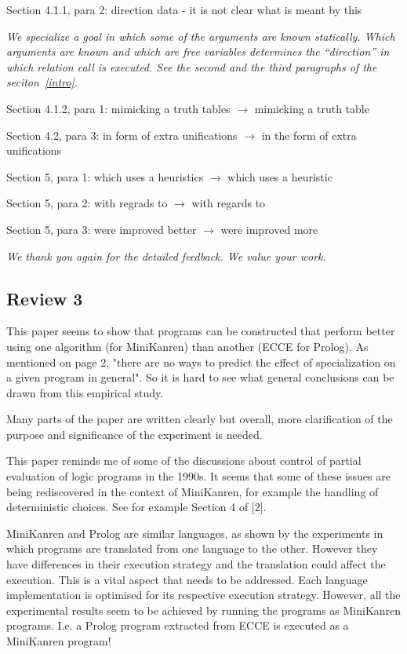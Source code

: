 Section 4.1.1, para 2: direction data - it is not clear what is meant by this

\emph{We specialize a \mk goal in which some of the arguments are known statically. Which arguments are known and which are free variables determines the ``direction'' in which relation call is executed. See the second and the third paragraphs of the seciton~\ref{intro}. }

Section 4.1.2, para 1: mimicking a truth tables $\to$ mimicking a truth table

Section 4.2, para 3: in form of extra unifications $\to$ in the form of extra unifications

Section 5, para 1: which uses a heuristics $\to$ which uses a heuristic

Section 5, para 2: with regrads to $\to$ with regards to

Section 5, para 3: were improved better $\to$ were improved more

\emph{We thank you again for the detailed feedback. We value your work.}

\subsection*{Review 3}

This paper seems to show that programs can be constructed that perform better using one algorithm (for MiniKanren) than another (ECCE for Prolog).  As mentioned on page 2, "there are no ways to predict the effect of specialization on a given program in general".  So it is hard to see what general conclusions can be drawn from this empirical study.

Many parts of the paper are written clearly but overall, more clarification of the purpose and significance of the experiment is needed.

This paper reminds me of some of the discussions about control of partial evaluation of logic programs in the 1990s.  It seems that some of these issues are being rediscovered in the context of MiniKanren, for example the handling of deterministic choices.  See for example Section 4 of [2].

MiniKanren and Prolog are similar languages, as shown by the experiments in which programs are translated from one language to the other.  However they have differences in their execution strategy and the translation could affect the execution.  This is a vital aspect that needs to be addressed.  Each language implementation is optimised for its respective execution strategy. However, all the experimental results seem to be achieved by running the programs as MiniKanren programs.  I.e. a Prolog program extracted from ECCE is executed as a MiniKanren program!



